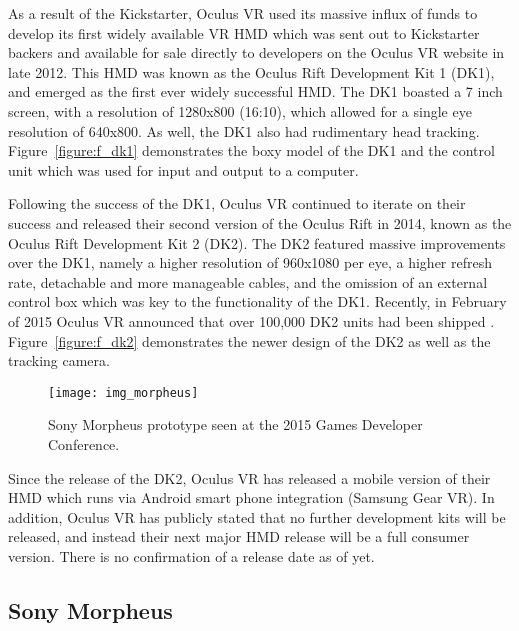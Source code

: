 As a result of the Kickstarter, Oculus VR used its massive influx of funds to develop its first widely available VR HMD which was sent out to Kickstarter backers and available for sale directly to developers on the Oculus VR website in late 2012. This HMD was known as the Oculus Rift Development Kit 1 (DK1), and emerged as the first ever widely successful HMD. The DK1 boasted a 7 inch screen, with a resolution of 1280x800 (16:10), which allowed for a single eye resolution of 640x800. As well, the DK1 also had rudimentary head tracking. Figure~\ref{figure:f_dk1} demonstrates the boxy model of the DK1 and the control unit which was used for input and output to a computer.

Following the success of the DK1, Oculus VR continued to iterate on their success and released their second version of the Oculus Rift in 2014, known as the Oculus Rift Development Kit 2 (DK2). The DK2 featured massive improvements over the DK1, namely a higher resolution of 960x1080 per eye, a higher refresh rate, detachable and more manageable cables, and the omission of an external control box which was key to the functionality of the DK1. Recently, in February of 2015 Oculus VR announced that over 100,000 DK2 units had been shipped \cite{iribe_over_2015}.  Figure~\ref{figure:f_dk2} demonstrates the newer design of the DK2 as well as the tracking camera. 

\label{sec:sonyvr}
\begin{figure}
  \centering
  \texttt{[image: img\_morpheus]}
  \caption{Sony Morpheus prototype seen at the 2015 Games Developer Conference.}
  \label{figure:f_sony_m}
\end{figure}

Since the release of the DK2, Oculus VR has released a mobile version of their HMD which runs via Android smart phone integration (Samsung Gear VR). In addition, Oculus VR has publicly stated that no further development kits will be released, and instead their next major HMD release will be a full consumer version. There is no confirmation of a release date as of yet.

\subsection{Sony Morpheus}

